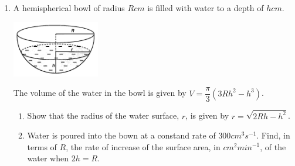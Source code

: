 \documentclass{report}
\begin{document}
\begin{multicols*}{2}
\begin{enumerate}
            \item A hemispherical bowl of radius $R\textit{cm}$ is filled with water to a depth
                  of $h\textit{cm}$.
                  \begin{center}
                        \includegraphics[width=0.3\textwidth]{./images/q33.jpeg}
                  \end{center}
                  The volume of the water in the bowl is given by $V = \dfrac{\pi}{3}(3Rh^2 - h^3)$.
                  \begin{enumerate}
                        \item Show that the radius of the water surface, $r$, is given by $r = \sqrt{2Rh -
                                          h^2}$.
                        \item Water is poured into the bown at a constand rate of $300cm^3s^{-1}$. Find, in
                              terms of $R$, the rate of increase of the surface area, in $cm^2
                                    \textit{min}^{-1}$, of the water when $2h = R$.
                  \end{enumerate}
      \end{enumerate}
\end{multicols*}
\end{document}
